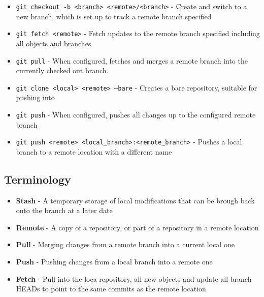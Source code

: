 \begin{itemize}
\item\texttt{git checkout -b <branch> <remote>/<branch>} - Create and switch to a new branch, which is set up to track a remote branch specified

\item\texttt{git fetch <remote>} - Fetch updates to the remote branch specified including all objects and branches

\item\texttt{git pull} - When configured, fetches and merges a remote branch into the currently checked out branch.

\item\texttt{git clone <local> <remote> --bare} - Creates a bare repository, suitable for pushing into

\item\texttt{git push} - When configured, pushes all changes up to the configured remote branch

\item\texttt{git push <remote> <local\_branch>:<remote\_branch>} - Pushes a local branch to a remote location with a different name

\end{itemize}

\subsection{Terminology}
\begin{itemize}
\item\textbf{Stash} - A temporary storage of local modifications that can be brough back onto the branch at a later date
\item\textbf{Remote} - A copy of a repository, or part of a repository in a remote location
\item\textbf{Pull} - Merging changes from a remote branch into a current local one
\item\textbf{Push} - Pushing changes from a local branch into a remote one
\item\textbf{Fetch} - Pull into the loca repository, all new objects and update all branch HEADs to point to the same commits as the remote location
\end{itemize}
